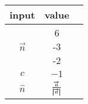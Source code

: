 \begin{tabular}[10pt]{ |c| c| c|}
    \hline
    \textbf{input} & \textbf{value}\\ 
    \hline
    $\overrightarrow{n}$ & \myvec{6\\-3\\-2} \\
    \hline 
    $c$ &$-1$\\
    \hline 
    $\hat{n}$&$\frac{\overrightarrow{n}}{\left\vert\overrightarrow{n}\right\vert}$\\
    \hline
    \end{tabular}